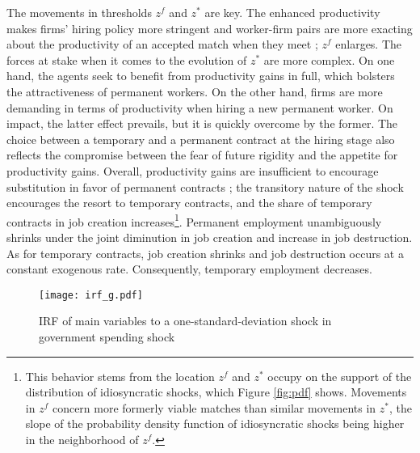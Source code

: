 The movements in thresholds $z^f$ and $z^*$ are key. The enhanced productivity makes firms' hiring policy more stringent and worker-firm pairs are more exacting about the productivity of an accepted match when they meet ; $z^f$ enlarges. The forces at stake when it comes to the evolution of $z^*$ are more complex. On one hand, the agents seek to benefit from productivity gains in full, which bolsters the attractiveness of permanent workers. On the other hand, firms are more demanding in terms of productivity when hiring a new permanent worker. On impact, the latter effect prevails, but it is quickly overcome by the former. The choice between a temporary and a permanent contract at the hiring stage also reflects the compromise between the fear of future rigidity and the appetite for productivity gains. Overall, productivity gains are insufficient to encourage substitution in favor of permanent contracts ; the transitory nature of the shock encourages the resort to temporary contracts, and the share of temporary contracts in job creation increases\footnote{This behavior stems from the location $z^f$ and $z^*$ occupy on the support of the distribution of idiosyncratic shocks, which Figure \ref{fig:pdf} shows. Movements in $z^f$ concern more formerly viable matches than similar movements in $z^*$, the slope of the probability density function of idiosyncratic shocks being higher in the neighborhood of $z^f$.}. Permanent employment unambiguously shrinks under the joint diminution in job creation and increase in job destruction. As for temporary contracts, job creation shrinks and job destruction occurs at a constant exogenous rate. Consequently, temporary employment decreases. 

\begin{figure}[t]
\texttt{[image: irf\_g.pdf]}
\caption{IRF of main variables to a one-standard-deviation shock in government spending shock}
\label{IRF_g}
\end{figure}

